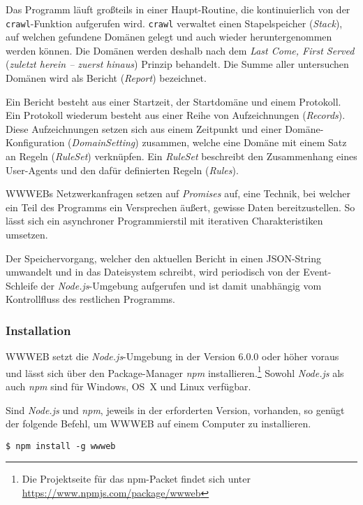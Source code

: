 Das Programm läuft großteils in einer Haupt-Routine, die kontinuierlich von der
\texttt{crawl}-Funktion aufgerufen wird. \texttt{crawl} verwaltet einen
Stapelspeicher (\emph{Stack}), auf welchen gefundene Domänen gelegt und auch
wieder heruntergenommen werden können. Die Domänen werden deshalb nach dem
\emph{Last Come, First Served} (\emph{zuletzt herein -- zuerst hinaus}) Prinzip
behandelt. Die Summe aller untersuchen Domänen wird als Bericht (\emph{Report})
bezeichnet.

Ein Bericht besteht aus einer Startzeit, der Startdomäne und einem Protokoll.
Ein Protokoll wiederum besteht aus einer Reihe von Aufzeichnungen
(\emph{Records}). Diese Aufzeichnungen setzen sich aus einem Zeitpunkt und
einer Domäne-Konfiguration (\emph{DomainSetting}) zusammen, welche eine Domäne
mit einem Satz an Regeln (\emph{RuleSet}) verknüpfen. Ein \emph{RuleSet}
beschreibt den Zusammenhang eines User-Agents und den dafür definierten Regeln
(\emph{Rules}).

WWWEBs Netzwerkanfragen setzen auf \emph{Promises} auf, eine Technik, bei
welcher ein Teil des Programms ein Versprechen äußert, gewisse Daten
bereitzustellen. So lässt sich ein asynchroner Programmierstil mit iterativen
Charakteristiken umsetzen.

Der Speichervorgang, welcher den aktuellen Bericht in einen JSON-String
umwandelt und in das Dateisystem schreibt, wird periodisch von der
Event-Schleife der \emph{Node.js}-Umgebung aufgerufen und ist damit unabhängig
vom Kontrollfluss des restlichen Programms.

\subsubsection{Installation}
\label{ssub:wwweb_installation}

WWWEB setzt die \emph{Node.js}-Umgebung in der Version 6.0.0 oder höher voraus
und lässt sich über den Package-Manager \emph{npm} installieren.\footnote{Die
Projektseite für das npm-Packet findet sich unter
\url{https://www.npmjs.com/package/wwweb}} Sowohl \emph{Node.js} als auch
\emph{npm} sind für Windows, OS~X und Linux verfügbar.

Sind \emph{Node.js} und \emph{npm}, jeweils in der erforderten Version,
vorhanden, so genügt der folgende Befehl, um WWWEB auf einem Computer zu
installieren.

\begin{lstlisting}[language=shell]
$ npm install -g wwweb
\end{lstlisting}

